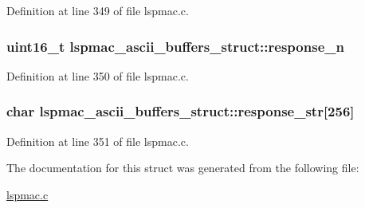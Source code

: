 Definition at line 349 of file lspmac.\-c.

\hypertarget{structlspmac__ascii__buffers__struct_a97c2fdd21eec29c2cba993e361c3c069}{
\subsubsection[{response\-\_\-n}]{\setlength{\rightskip}{0pt plus 5cm}uint16\-\_\-t lspmac\-\_\-ascii\-\_\-buffers\-\_\-struct\-::response\-\_\-n}}\label{structlspmac__ascii__buffers__struct_a97c2fdd21eec29c2cba993e361c3c069}


Definition at line 350 of file lspmac.\-c.

\hypertarget{structlspmac__ascii__buffers__struct_a32c4baecf20143eb71d348b6b5679039}{
\subsubsection[{response\-\_\-str}]{\setlength{\rightskip}{0pt plus 5cm}char lspmac\-\_\-ascii\-\_\-buffers\-\_\-struct\-::response\-\_\-str\mbox{[}256\mbox{]}}}\label{structlspmac__ascii__buffers__struct_a32c4baecf20143eb71d348b6b5679039}


Definition at line 351 of file lspmac.\-c.



The documentation for this struct was generated from the following file\-:\begin{DoxyCompactItemize}
\item 
\hyperlink{lspmac_8c}{lspmac.\-c}\end{DoxyCompactItemize}
